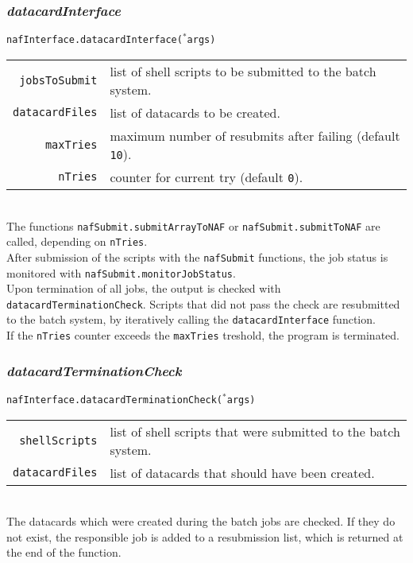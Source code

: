 \documentclass[12pt, a4paper]{article}
\newcommand{\args}{$^*$args}
\begin{document}
\subsubsection{\textit{datacardInterface}}
\texttt{nafInterface.datacardInterface(\args)}\\
\begin{tabular}{r|l}
\hline
\texttt{jobsToSubmit}	&	list of shell scripts to be submitted to the batch system.\\
\texttt{datacardFiles}	&	list of datacards to be created.\\
\texttt{maxTries}		&	maximum number of resubmits after failing (default \texttt{10}).\\
\texttt{nTries}			&	counter for current try (default \texttt{0}).\\
\hline
\end{tabular}
\\
The functions \texttt{nafSubmit.submitArrayToNAF} or \texttt{nafSubmit.submitToNAF} are called, depending on \texttt{nTries}.\\
After submission of the scripts with the \texttt{nafSubmit} functions, the job status is monitored with \texttt{nafSubmit.monitorJobStatus}.\\
Upon termination of all jobs, the output is checked with \texttt{datacardTerminationCheck}. Scripts that did not pass the check are resubmitted to the batch system, by iteratively calling the \texttt{datacardInterface} function.\\
If the \texttt{nTries} counter exceeds the \texttt{maxTries} treshold, the program is terminated.


\subsubsection{\textit{datacardTerminationCheck}}
\texttt{nafInterface.datacardTerminationCheck(\args)}\\
\begin{tabular}{r|l}
\hline
\texttt{shellScripts}	&	list of shell scripts that were submitted to the batch system.\\
\texttt{datacardFiles}	&	list of datacards that should have been created.\\
\hline
\end{tabular}
\\
The datacards which were created during the batch jobs are checked. If they do not exist, the responsible job is added to a resubmission list, which is returned at the end of the function.
\end{document}
